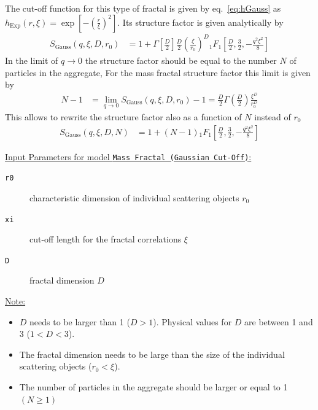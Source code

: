 The cut-off function for this type of fractal is given by eq.\ \ref{eq:hGauss} as
$h_\text{Exp}(r,\xi) = \exp\left[-\left(\tfrac{r}{\xi}\right)^2\right]$. Its structure factor is given analytically by
\begin{align}
S_\text{Gauss}(q,\xi,D,r_0) &= 1 +
    \Gamma\left[\tfrac{D}{2}\right]\frac{D}{2}
    \left(\frac{\xi}{r_0}\right)^D
    {}_1F_1\left[\tfrac{D}{2},\tfrac{3}{2},-\tfrac{q^2\xi^2}{8}\right]
\end{align}
In the limit of $q \to 0$ the structure factor should be equal to the number $N$ of particles in the aggregate, For the mass fractal structure factor this limit is given by
\begin{align}\label{eq:fractalGauss}
  N-1 & =\lim_{q\to 0}  S_\text{Gauss}(q,\xi,D,r_0)-1 = \frac{D}{2}\Gamma\left( \frac{D}{2} \right) \frac{\xi^D}{r_0^D}
\end{align}
This allows to rewrite the structure factor also as a function of $N$ instead of $r_0$
\begin{align}
S_\text{Gauss}(q,\xi,D,N) &= 1 +  (N-1) {}_1F_1\left[\tfrac{D}{2},\tfrac{3}{2},-\tfrac{q^2\xi^2}{8}\right]
\end{align}


\underline{Input Parameters for model \texttt{Mass Fractal (Gaussian Cut-Off)}:}
\begin{description}
\item[\texttt{r0}] characteristic dimension of individual scattering objects $r_0$
\item[\texttt{xi}] cut-off length for the fractal correlations $\xi$
\item[\texttt{D}] fractal dimension $D$
\end{description}

\underline{Note:}
\begin{itemize}
\item $D$ needs to be larger than 1 ($D>1$). Physical values for $D$ are between 1 and 3 ($1<D<3$).
\item The fractal dimension needs to be large than the size of the individual scattering objects ($r_0 < \xi$).
\item The number of particles in the aggregate should be larger or equal to 1 $(N\geq 1)$
\end{itemize}

